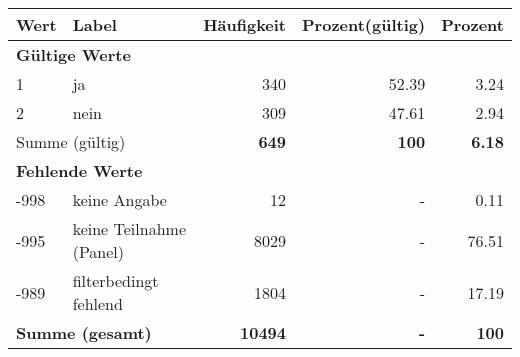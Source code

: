      \begin{longtable}{lXrrr}
     \toprule
     \textbf{Wert} & \textbf{Label} & \textbf{Häufigkeit} & \textbf{Prozent(gültig)} & \textbf{Prozent} \\
     \endhead
     \midrule
     \multicolumn{5}{l}{\textbf{Gültige Werte}}\\

     1 &
     \multicolumn{1}{X}{ ja   } &


       \num{340} &
       \num[round-mode=places,round-precision=2]{52.39} &
         \num[round-mode=places,round-precision=2]{3.24} \\

     2 &
     \multicolumn{1}{X}{ nein   } &


       \num{309} &
       \num[round-mode=places,round-precision=2]{47.61} &
         \num[round-mode=places,round-precision=2]{2.94} \\
     \midrule
     \multicolumn{2}{l}{Summe (gültig)} &
       \textbf{\num{649}} &
     \textbf{\num{100}} &
       \textbf{\num[round-mode=places,round-precision=2]{6.18}} \\
     \multicolumn{5}{l}{\textbf{Fehlende Werte}}\\
       -998 &
       keine Angabe &
         \num{12} &
        - &
         \num[round-mode=places,round-precision=2]{0.11} \\
       -995 &
       keine Teilnahme (Panel) &
         \num{8029} &
        - &
         \num[round-mode=places,round-precision=2]{76.51} \\
       -989 &
       filterbedingt fehlend &
         \num{1804} &
        - &
         \num[round-mode=places,round-precision=2]{17.19} \\
     \midrule
     \multicolumn{2}{l}{\textbf{Summe (gesamt)}} &
          \textbf{\num{10494}} &
        \textbf{-} &
        \textbf{\num{100}} \\
     \bottomrule
     \end{longtable}
     
